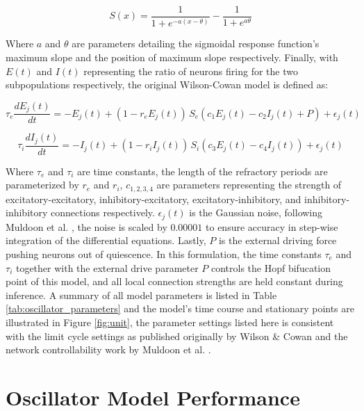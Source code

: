 \begin{equation}
\label{eq:sigmoid}
S(x) = \frac{1}{1+e^{-a(x-\theta)}} - \frac{1}{1+e^{a \theta}}
\end{equation}

Where $a$ and $\theta$ are parameters detailing the sigmoidal response function's maximum slope and the position of maximum slope respectively. Finally, with $E(t)$ and $I(t)$ representing the ratio of neurons firing for the two subpopulations respectively, the original Wilson-Cowan model is defined as:

\begin{equation}
    \label{eq:wco_ex}
\tau_e \frac{dE_{j}(t)}{dt} = -E_{j}(t) + (1 - r_e E_{j}(t)) \, S_e(c_1 E_{j}(t) - c_2 I_{j}(t) + P) + \epsilon_{j} (t)
\end{equation}

\begin{equation}
\label{eq:wco_in}
\tau_i \frac{dI_{j}(t)}{dt} = -I_{j}(t) + (1 - r_i I_{j}(t)) \, S_i(c_3 E_{j}(t) - c_4 I_{j}(t)) + \epsilon_{j} (t)
\end{equation}

Where $\tau_e$ and $\tau_i$ are time constants, the length of the refractory periods are parameterized by $r_e$ and $r_i$, $c_{1,2,3,4}$ are parameters representing the strength of excitatory-excitatory, inhibitory-excitatory, excitatory-inhibitory, and inhibitory-inhibitory connections respectively. $\epsilon_{j} (t)$ is the Gaussian noise, following Muldoon et al. \cite{muldoon_stimulation-based_2016}, the noise is scaled by $0.00001$ to ensure accuracy in step-wise integration of the differential equations. Lastly, $P$ is the external driving force pushing neurons out of quiescence. In this formulation, the time constants $\tau_e$ and $\tau_i$ together with the external drive parameter $P$ controls the Hopf bifucation point of this model, and all local connection strengths are held constant during inference. A summary of all model parameters is listed in Table \ref{tab:oscillator_parameters} and the model's time course and stationary points are illustrated in Figure \ref{fig:unit}, the parameter settings listed here is consistent with the limit cycle settings as published originally by Wilson \& Cowan \cite{Wilson1972} and the network controllability work by Muldoon et al. \cite{muldoon_stimulation-based_2016}.

\section{Oscillator Model Performance}

